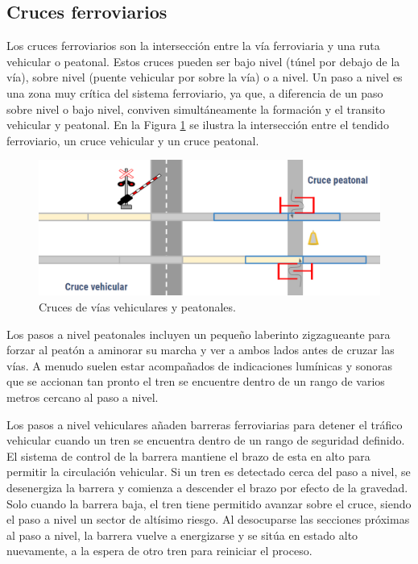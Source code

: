 \subsection{Cruces ferroviarios}
    
    Los cruces ferroviarios son la intersección entre la vía ferroviaria y una ruta vehicular o peatonal. Estos cruces pueden ser bajo nivel (túnel por debajo de la vía), sobre nivel (puente vehicular por sobre la vía) o a nivel. Un paso a nivel es una zona muy crítica del sistema ferroviario, ya que, a diferencia de un paso sobre nivel o bajo nivel, conviven simultáneamente la formación y el transito vehicular y peatonal. En la Figura \ref{fig:cruce_1} se ilustra la intersección entre el tendido ferroviario, un cruce vehicular y un cruce peatonal.
    
        \begin{figure}[!h]
            \centering
            \includegraphics[width=1\textwidth]{Figuras/cruce}
            \centering\caption{Cruces de vías vehiculares y peatonales.}
            \label{fig:cruce_1}
        \end{figure}
        
    Los pasos a nivel peatonales incluyen un pequeño laberinto zigzagueante para forzar al peatón a aminorar su marcha y ver a ambos lados antes de cruzar las vías. A menudo suelen estar acompañados de indicaciones lumínicas y sonoras que se accionan tan pronto el tren se encuentre dentro de un rango de varios metros cercano al paso a nivel.
    
    Los pasos a nivel vehiculares añaden barreras ferroviarias para detener el tráfico vehicular cuando un tren se encuentra dentro de un rango de seguridad definido.  El sistema de control de la barrera mantiene el brazo de esta en alto para permitir la circulación vehicular. Si un tren es detectado cerca del paso a nivel, se desenergiza la barrera y comienza a descender el brazo por efecto de la gravedad. Solo cuando la barrera baja, el tren tiene permitido avanzar sobre el cruce, siendo el paso a nivel un sector de altísimo riesgo. Al desocuparse las secciones próximas al paso a nivel, la barrera vuelve a energizarse y se sitúa en estado alto nuevamente, a la espera de otro tren para reiniciar el proceso. 
    
